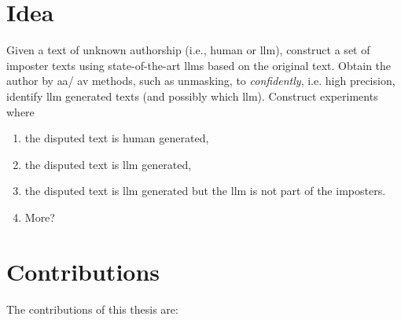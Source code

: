 \section{Idea}
\label{sec:idea}

Given a text of unknown authorship (i.e., human or \ac{llm}), 
construct a set of imposter texts using state-of-the-art \acp{llm} based on the original text.
Obtain the author by \ac{aa}/ \ac{av} methods, such as unmasking, to \textit{confidently}, i.e. high precision, identify \ac{llm} generated texts
(and possibly which \ac{llm}).
Construct experiments where
\begin{enumerate}
    \item the disputed text is human generated,
    \item the disputed text is \ac{llm} generated,
    \item the disputed text is \ac{llm} generated but the \ac{llm} is not part of the imposters.
    \item More?
\end{enumerate}


\section{Contributions}
\label{sec:contributions}
The contributions of this thesis are:
